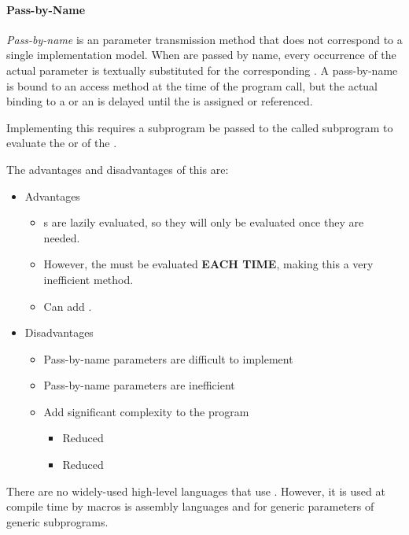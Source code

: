 \paragraph{Pass-by-Name}\label{par:Parameter_Passing-Pass_By_Name}
\begin{definition}\label{def:Pass_By_Name}
  \emph{Pass-by-name} is an  parameter transmission method that does not correspond to a single implementation model.
  When  are passed by name, every occurrence of the actual parameter is textually substituted for the corresponding .
  A pass-by-name  is bound to an access method at the time of the program call, but the actual binding to a  or an  is delayed until the  is assigned or referenced.

  Implementing this requires a subprogram be passed to the called subprogram to evaluate the  or  of the .

  The advantages and disadvantages of this are:
  \begin{itemize}[noitemsep]
  \item Advantages
    \begin{itemize}[noitemsep]
    \item {}s are lazily evaluated, so they will only be evaluated once they are needed.
    \item However, the  must be evaluated \textbf{EACH TIME}, making this a very inefficient method.
    \item Can add .
    \end{itemize}
  \item Disadvantages
    \begin{itemize}[noitemsep]
    \item Pass-by-name parameters are difficult to implement
    \item Pass-by-name parameters are inefficient
    \item Add significant complexity to the program
      \begin{itemize}[noitemsep]
      \item Reduced 
      \item Reduced 
      \end{itemize}
    \end{itemize}
  \end{itemize}

  \begin{remark}\label{rmk:Langauges_Using_Pass_By_Name}
    There are no widely-used high-level languages that use .
    However, it is used at compile time by macros is assembly languages and for generic parameters of generic subprograms.
  \end{remark}
\end{definition}

